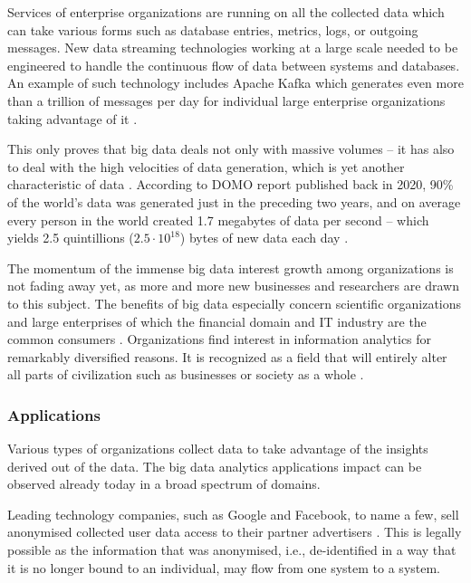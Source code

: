 \documentclass[a4paper,twoside,12pt]{book}
\begin{document}
Services of enterprise organizations are running on all the collected data which can take various forms such as database entries, metrics, logs, or outgoing messages. New data streaming technologies working at a large scale needed to be engineered to handle the continuous flow of data between systems and databases. An example of such technology includes Apache Kafka which generates even more than a trillion of messages per day for individual large enterprise organizations taking advantage of it \cite{bib:kafka_online,bib:kafka}.

This only proves that big data deals not only with massive volumes – it has also to deal with the high velocities of data generation, which is yet another characteristic of data \cite{bib:big_data_analytics}. According to DOMO report published back in 2020, 90\% of the world's data was generated just in the preceding two years, and on average every person in the world created 1.7 megabytes of data per second – which yields 2.5 quintillions ($2.5 \cdot 10^{18}$) bytes of new data each day \cite{bib:domo}.

The momentum of the immense big data interest growth among organizations is not fading away yet, as more and more new businesses and researchers are drawn to this subject. The benefits of big data especially concern scientific organizations and large enterprises of which the financial domain and IT industry are the common consumers \cite{bib:anonymization_chaos}. Organizations find interest in information analytics for remarkably diversified reasons. It is recognized as a field that will entirely alter all parts of civilization such as businesses or society as a whole \cite{bib:big_data_in_practice}.

\subsubsection{Applications}

Various types of organizations collect data to take advantage of the insights derived out of the data. The big data analytics applications impact can be observed already today in a broad spectrum of domains. 

Leading technology companies, such as Google and Facebook, to name a few, sell anonymised collected user data access to their partner advertisers \cite{bib:big_data_in_practice}. This is legally possible as the information that was anonymised, i.e., de-identified in a way that it is no longer bound to an individual, may flow from one system to a system.
\end{document}
